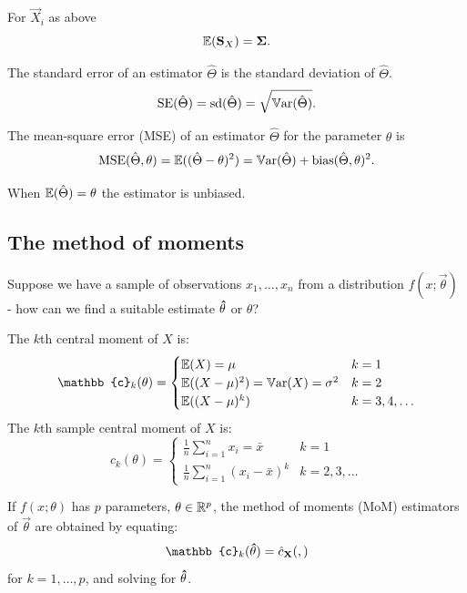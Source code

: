 \documentclass[10pt, a4paper]{article}
\begin{document}
\begin{proposition}
    For $\vec{X}_i$ as above
    \[
    \mathbb{E}(\mathbf{S}_X) = \mathbf{\Sigma}.
    \]
\end{proposition}

\begin{definition}
    The standard error of an estimator $\hat{\Theta}$ is the standard deviation of $\hat{\Theta}$.
    \[
    \mathrm{SE}(\hat{\Theta}) = \mathrm{sd}(\hat{\Theta}) = \sqrt{\mathbb{V}\mathrm{ar}(\hat{\Theta})}.
    \]
\end{definition}

\begin{definition}
    The mean-square error
    (MSE)
    of an estimator $\hat{\Theta}$ for the parameter $\theta$ is
    \[
    \mathrm{MSE}(\hat{\Theta}, \theta) = \mathbb{E}((\hat{\Theta} - \theta) ^ 2) = \mathbb{V}\mathrm{ar}(\hat{\Theta}) + \operatorname{bias}(\hat{\Theta}, \theta) ^ 2.
    \]
\end{definition}

When $\mathbb{E}(\hat{\Theta}) = \theta$ the estimator is unbiased.

\subsection{The method of moments}

Suppose we have a sample of observations $x_1, \dotsc, x_n$ from a distribution $f(x; \vec{\theta})$ -
how can we find a suitable estimate $\mathbf{\hat{\theta}}$ or $\theta$?

\begin{definition}
    The $k$th central moment of $X$ is:
    \[
    \mathbb{c}_k(\theta) = \begin{cases}
        \E(X) = \mu & k = 1 \\
        \E((X - \mu) ^ 2) = \Var(X) = \sigma ^ 2 & k = 2 \\
        \E((X - \mu) ^ k) & k = 3, 4, \dotsc
    \end{cases}
    \]
    The $k$th sample central moment of $X$ is:
    \[
    \hat{c}_k(\theta) = \begin{cases}
        \frac{1}{n}\sum_{i = 1}^{n}x_i = \bar{x} & k = 1 \\
        \frac{1}{n}\sum_{i = 1}^{n}(x_i - \bar{x}) ^ k & k = 2, 3, \dotsc
    \end{cases}
    \]
\end{definition}

\begin{definition}
    If $f(x; \theta)$ has $p$ parameters,
    $\mathbf{\theta} \in \mathbb{R} ^ p$,
    the method of moments
    (MoM)
    estimators of $\vec{\theta}$ are obtained by equating:
    \[
    \mathbb{c}_k(\hvec{\theta}) = \hat{c}_{\vec{X}}(,)
    \]
    for $k = 1, \dotsc, p$,
    and solving for $\mathbf{\hat{\theta}}$.
\end{definition}
\end{document}
